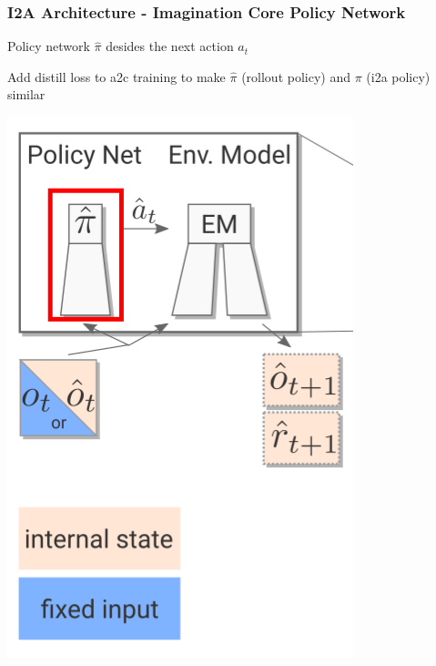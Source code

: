 \begin{frame}
    \frametitle{I2A Architecture - Imagination Core Policy Network}

\begin{multicols}{2}
	\begin{PraesentationAufzaehlung}
	    \item Policy network $\hat{\pi}$ desides the next action $a_t$
		\item Add distill loss to a2c training to make $\hat{\pi}$ (rollout policy) and $\pi$ (i2a policy) similar
	\end{PraesentationAufzaehlung}
    \vfill\columnbreak
	\begin{center}
    \includegraphics[height=0.5\textheight]{./Images/policy.png}%
	\end{center}
\end{multicols}
    
\end{frame}
\clearpage





